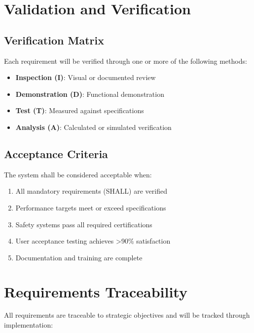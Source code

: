\section{Validation and Verification}

\subsection{Verification Matrix}

Each requirement will be verified through one or more of the following methods:

\begin{itemize}
    \item \textbf{Inspection (I)}: Visual or documented review
    \item \textbf{Demonstration (D)}: Functional demonstration
    \item \textbf{Test (T)}: Measured against specifications
    \item \textbf{Analysis (A)}: Calculated or simulated verification
\end{itemize}

\subsection{Acceptance Criteria}

The system shall be considered acceptable when:

\begin{enumerate}
    \item All mandatory requirements (SHALL) are verified
    \item Performance targets meet or exceed specifications
    \item Safety systems pass all required certifications
    \item User acceptance testing achieves >90\% satisfaction
    \item Documentation and training are complete
\end{enumerate}

\section{Requirements Traceability}

All requirements are traceable to strategic objectives and will be tracked through implementation:

